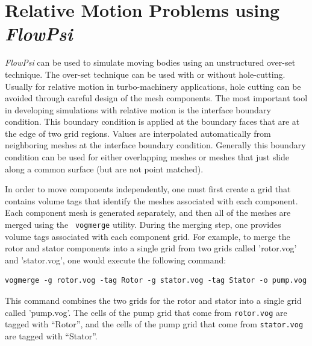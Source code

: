 \documentclass{article}
\begin{document}



\section{Relative Motion Problems using {\em FlowPsi}}

{\em FlowPsi} can be used to simulate moving bodies using an unstructured
over-set technique.  The over-set technique can be used with or without
hole-cutting.  Usually for relative motion in turbo-machinery
applications, hole cutting can be avoided through careful design of
the mesh components.  The most important tool in developing
simulations with relative motion is the interface boundary condition.
This boundary condition is applied at the boundary faces that are at
the edge of two grid regions.  Values are interpolated automatically
from neighboring meshes at the interface boundary condition.
Generally this boundary condition can be used for either overlapping
meshes or meshes that just slide along a common surface (but are not
point matched).

In order to move components independently, one must first create a grid
that contains volume tags that identify the meshes associated with
each component.  Each component mesh is generated
separately, and then all of the meshes are merged using the {\tt
  vogmerge} utility.  During the merging step, one provides
volume tags associated with each component grid.  For example, to merge the
rotor and stator components into a single grid from two grids called
'rotor.vog' and 'stator.vog', one would execute the following command:
\begin{verbatim}
vogmerge -g rotor.vog -tag Rotor -g stator.vog -tag Stator -o pump.vog
\end{verbatim}
This command combines the two grids for the rotor and stator into a
single grid called 'pump.vog'.  The cells of the pump grid that come from
{\tt rotor.vog} are tagged with ``Rotor'', and the cells of the pump grid
that come from {\tt stator.vog} are tagged with ``Stator''. 
\end{document}
